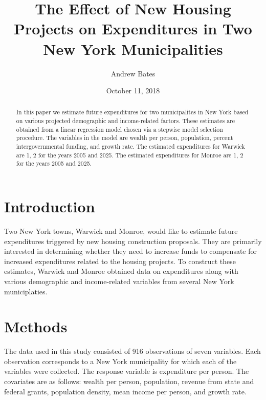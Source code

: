 \documentclass{article}\usepackage[]{graphicx}\usepackage[]{color}
\title{The Effect of New Housing Projects on Expenditures in Two New York Municipalities}
\author{Andrew Bates}
\date{October 11, 2018}
\begin{document}
 
\maketitle

\begin{abstract}
In this paper we estimate future expenditures for two municipalites in New York based on various projected demographic and income-related factors. These estimates are obtained from a linear regression model chosen via a stepwise model selection procedure. The variables in the model are wealth per person, population, percent intergovernmental funding, and growth rate. The estimated expenditures for Warwick are 1, 2 for the years 2005 and 2025. The estimated expenditures for Monroe are 1, 2 for the years 2005 and 2025.
\end{abstract}


\section{Introduction} \label{intro}

Two New York towns, Warwick and Monroe, would like to estimate future expenditures triggered by new housing construction proposals. They are primarily interested in determining whether they need to increase funds to compensate for increased expenditures related to the housing projects. To construct these estimates, Warwick and Monroe obtained data on expenditures along with various demographic and income-related variables from several New York municiplaties. 

\section{Methods} \label{methods}

The data used in this study consisted of 916 observations of seven variables. Each observation corresponds to a New York municipality for which each of the variables were collected. The response variable is expenditure per person. The covariates are as follows: wealth per person, population, revenue from state and federal grants, population density, mean income per person, and growth rate.
\end{document}
